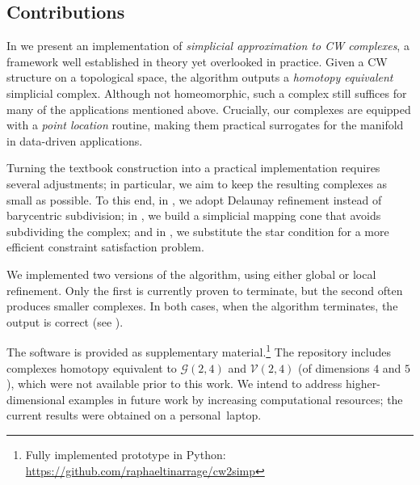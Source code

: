 \documentclass[a4paper,english,cleveref,autoref,thm-restate,nolineno]{socg-lipics-v2021}
\newcommand{\GG}{\mathcal G} %
\newcommand{\VV}{\mathcal V} %
\newif\iffullversion
\newcommand{\fullonly}[1]{\iffullversion #1\fi}
\newcommand{\shortonly}[1]{\iffullversion\else #1\fi}
\begin{document}
\subsection{Contributions}

In  we present an implementation of \emph{simplicial approximation to CW complexes}, a framework well established in theory yet overlooked in practice. 
Given a CW structure on a topological space, the algorithm outputs a \textit{homotopy equivalent} simplicial complex.
Although not homeomorphic, such a complex still suffices for many of the applications mentioned above.
Crucially, our complexes are equipped with a \emph{point location} routine, making them practical surrogates for the manifold in data-driven applications.

Turning the textbook construction into a practical implementation requires several adjustments; in particular, we aim to keep the resulting complexes as small as possible.
To this end, in , we adopt Delaunay refinement instead of barycentric subdivision; in , we build a simplicial mapping cone that avoids subdividing the complex; and in , we substitute the star condition for a more efficient constraint satisfaction problem.

We implemented two versions of the algorithm, using either global or local refinement. 
Only the first is currently proven to terminate, but the second often produces smaller complexes.
In both cases, when the algorithm terminates, the output is correct (see ).

The software is provided as supplementary material.\shortonly{\footnote{Fully implemented prototype in Python: \url{https://github.com/raphaeltinarrage/cw2simp}}}
The repository includes complexes homotopy equivalent to $\GG(2,4)$ and $\VV(2,4)$ (of dimensions $4$ and $5$), which were not available prior to this work.
We intend to address higher-dimensional examples in future work by increasing computational resources; the current results were obtained on a personal~laptop.

\fullonly{
Although the focus here is theoretical, our work is motivated by \textit{Topological Data Analysis}, a theory that uses topological invariants to study real data. Our two main outputs---triangulations of new manifolds and a framework for simplicial approximation---naturally set the stage for new methods in data science; we suggest two such applications in \Cref{sec:applications}.
}
\end{document}
